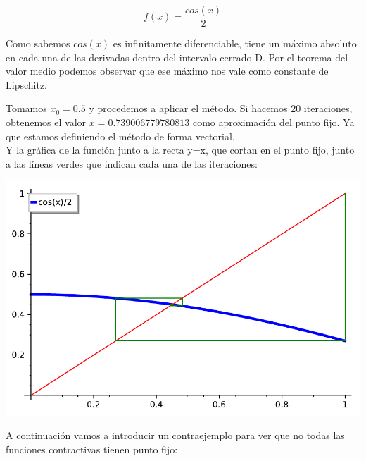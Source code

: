\begin{example}
	$$f(x) = \frac{cos(x)}{2}$$
	
	Como sabemos $cos(x)$ es infinitamente diferenciable, tiene un máximo absoluto en cada una de las derivadas dentro del intervalo cerrado D. Por el teorema del valor medio podemos observar que ese máximo nos vale como constante de Lipschitz.
	
	Tomamos $x_0 = 0.5$ y procedemos a aplicar el método.
	Si hacemos 20 iteraciones, obtenemos el valor $x = 0.739006779780813$ como aproximación del punto fijo.
%	
Ya que estamos definiendo el método de forma vectorial.\\

Y la gráfica de la función junto a la recta y=x, que cortan en el punto fijo, junto a las líneas verdes que indican cada una de las iteraciones:

\includegraphics{imagenes/ejemplo1_puntofijo.pdf}
\end{example}

A continuación vamos a introducir un contraejemplo para ver que no todas las funciones contractivas tienen punto fijo:

